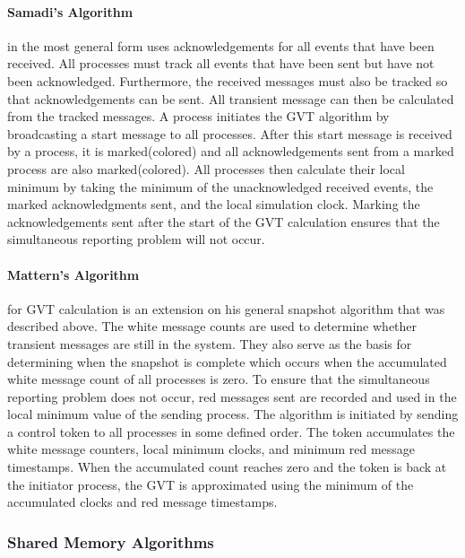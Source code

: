 \documentclass[11pt]{book}
\begin{document}
\paragraph{Samadi's Algorithm}\cite{samadi-85} in the most general form uses acknowledgements for
all events that have been received.  All processes must track all events that have been sent but
have not been acknowledged.  Furthermore, the received messages must also be tracked so that
acknowledgements can be sent.  All transient message can then be calculated from the tracked
messages.  A process initiates the GVT algorithm by broadcasting a start message to all processes.
After this start message is received by a process, it is marked(colored) and all acknowledgements
sent from a marked process are also marked(colored).  All processes then calculate their local
minimum by taking the minimum of the unacknowledged received events, the marked acknowledgments
sent, and the local simulation clock.  Marking the acknowledgements sent after the start of the GVT
calculation ensures that the simultaneous reporting problem will not occur.

\paragraph{Mattern's Algorithm} \cite{mattern-93} for GVT calculation is an extension on his general
snapshot algorithm that was described above.  The white message counts are used to determine whether
transient messages are still in the system.  They also serve as the basis for determining when the
snapshot is complete which occurs when the accumulated white message count of all processes is zero.
To ensure that the simultaneous reporting problem does not occur, red messages sent are recorded and
used in the local minimum value of the sending process.  The algorithm is initiated by sending a
control token to all processes in some defined order.  The token accumulates the white message
counters, local minimum clocks, and minimum red message timestamps.  When the accumulated count
reaches zero and the token is back at the initiator process, the GVT is approximated using the
minimum of the accumulated clocks and red message timestamps.

\subsubsection{Shared Memory Algorithms}
\end{document}
